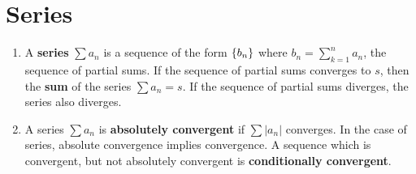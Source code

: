\section{Series}
\begin{enumerate}
	\item A \textbf{series} $\sum a_n$ is a sequence of the form $\{b_n\}$ where $b_n = \sum_{k=1}^n a_n$, the sequence of partial sums. If the sequence of partial sums converges to $s$, then the \textbf{sum} of the series $\sum a_n = s$. If the sequence of partial sums diverges, the series also diverges.
	\item A series $\sum a_n$ is \textbf{absolutely convergent} if $\sum |a_n|$ converges. In the case of series, absolute convergence implies convergence. A sequence which is convergent, but not absolutely convergent is \textbf{conditionally convergent}.
\end{enumerate}

